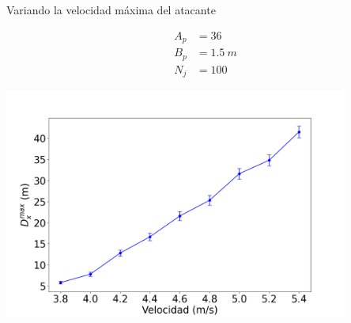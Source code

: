 \begin{frame}{Variando la velocidad máxima del atacante}
    \begin{center}
        \begin{minipage}{0.15\textwidth}
            \begin{equation*}
                \begin{aligned}
                    A_p &= 36 \\
                    B_p &= 1.5\ m \\
                    N_j &= 100
                \end{aligned}
            \end{equation*}
        \end{minipage}
        \begin{minipage}{0.80\textwidth}
            \hfill\includegraphics[width=0.85\textwidth]{pic/05-resultados/r12}
        \end{minipage}
    \end{center}
    \footnotesize{}
\end{frame}

